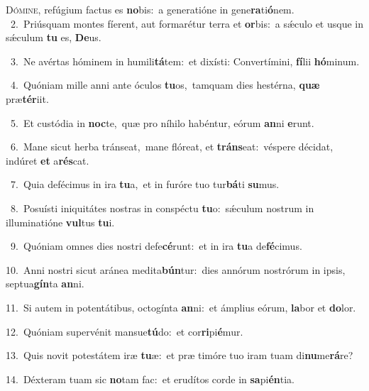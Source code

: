 \lettrine{\initial\textcolor{\initialcolor}{D}}{ómine,} refúgium factus es \textbf{no}\-bis:~\star a generatióne in gene\-\textbf{ra}\-ti\-\textbf{ó}\-nem.\\
{\numbfont\textcolor{\numbcolor}{~2.}}~Priúsquam montes fíerent, aut formarétur terra et \textbf{or}\-bis:~\star a sǽculo et usque in sǽculum \textbf{tu} es, \textbf{De}\-us.\par
{\numbfont\textcolor{\numbcolor}{~3.}}~Ne avértas hóminem in humili\-\textbf{tá}\-tem:~\star et dixísti: Convertímini, \textbf{fí}\-lii \textbf{hó}\-minum.\par
{\numbfont\textcolor{\numbcolor}{~4.}}~Quóniam mille anni ante óculos \textbf{tu}\-os,~\star tamquam dies hestérna, \textbf{quæ} præ\-\textbf{tér}\-iit.\par
{\numbfont\textcolor{\numbcolor}{~5.}}~Et custódia in \textbf{noc}\-te,~\star quæ pro níhilo habéntur, eórum \textbf{an}\-ni \textbf{e}\-runt.\par
{\numbfont\textcolor{\numbcolor}{~6.}}~Mane sicut herba tránseat,~\dagger mane flóreat, et \textbf{tráns}\-eat:~\star véspere décidat, indúret \textbf{et} a\-\textbf{rés}\-cat.\par
{\numbfont\textcolor{\numbcolor}{~7.}}~Quia defécimus in ira \textbf{tu}\-a,~\star et in furóre tuo tur\-\textbf{bá}\-ti \textbf{su}\-mus.\par
{\numbfont\textcolor{\numbcolor}{~8.}}~Posuísti iniquitátes nostras in conspéctu \textbf{tu}\-o:~\star sǽculum nostrum in illuminatióne \textbf{vul}\-tus \textbf{tu}\-i.\par
{\numbfont\textcolor{\numbcolor}{~9.}}~Quóniam omnes dies nostri defe\-\textbf{cé}\-runt:~\star et in ira \textbf{tu}\-a de\-\textbf{fé}\-cimus.\par
{\numbfont\textcolor{\numbcolor}{10.}}~Anni nostri sicut aránea medita\-\textbf{bún}\-tur:~\star dies annórum nostrórum in ipsis, septua\-\textbf{gín}\-ta \textbf{an}\-ni.\par
{\numbfont\textcolor{\numbcolor}{11.}}~Si autem in potentátibus, octogínta \textbf{an}\-ni:~\star et ámplius eórum, \textbf{la}\-bor et \textbf{do}\-lor.\par
{\numbfont\textcolor{\numbcolor}{12.}}~Quóniam supervénit mansue\-\textbf{tú}\-do:~\star et cor\-\textbf{ri}\-pi\-\textbf{é}\-mur.\par
{\numbfont\textcolor{\numbcolor}{13.}}~Quis novit potestátem iræ \textbf{tu}\-æ:~\star et præ timóre tuo iram tuam di\-\textbf{nu}\-me\-\textbf{rá}\-re?\par
{\numbfont\textcolor{\numbcolor}{14.}}~Déxteram tuam sic \textbf{no}\-tam fac:~\star et erudítos corde in \textbf{sa}\-pi\-\textbf{én}\-tia.\par
